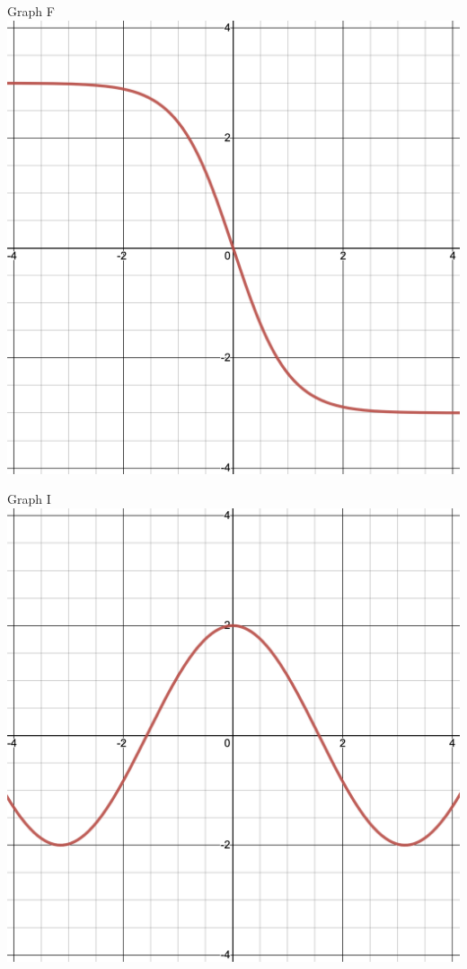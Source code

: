 \documentclass{siproblemset}
\begin{document}
\begin{multipartquestion}
\begin{multicols}{3}
\begin{center}
            \end{center}
            \begin{center}
                Graph F
                \includegraphics[width=\linewidth]{img/pt2-graph3d}
            \end{center}
            \begin{center}
                Graph I
                \includegraphics[width=\linewidth]{img/pt2-graph3h}

\end{center}
\end{multicols}
\end{multipartquestion}
\end{document}
